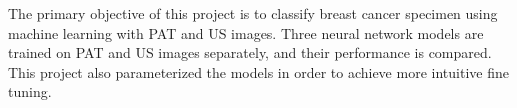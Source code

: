 The primary objective of this project is to classify breast cancer specimen using machine learning with PAT and US images. 
Three neural network models are trained on PAT and US images separately, and their performance is compared. 
This project also parameterized the models in order to achieve more intuitive fine tuning.




